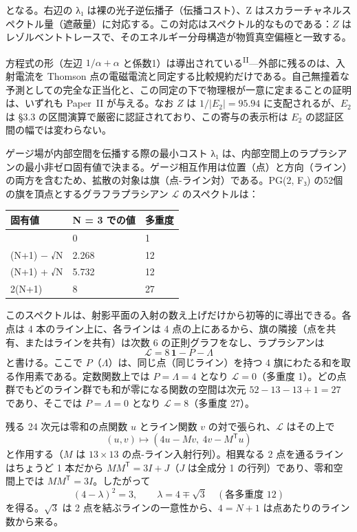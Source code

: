 \documentclass[fontsize=11pt,paper=a4,lualatex]{jlreq}
\newcommand{\PII}{\textsuperscript{\textup{II}}}
\begin{document}
となる。右辺の λ₁ は裸の光子逆伝播子（伝播コスト）、Z はスカラーチャネルスペクトル量（遮蔽量）に対応する。この対応はスペクトル的なものである：$Z$ はレゾルベントトレースで、そのエネルギー分母構造が物質真空偏極と一致する。

方程式の形（左辺 $1/\alpha + \alpha$ と係数1）は導出されている\PII{}---外部に残るのは、入射電流を Thomson 点の電磁電流と同定する比較規約だけである。自己無撞着な予測としての完全な正当化と、この同定の下で物理根が一意に定まることの証明は、いずれも Paper~II が与える。なお $Z$ は $1/|E_2| = 95.94$ に支配されるが、$E_2$ は §3.3 の区間演算で厳密に認証されており、この寄与の表示桁は $E_2$ の認証区間の幅では変わらない。

ゲージ場が内部空間を伝播する際の最小コスト λ₁
は、内部空間上のラプラシアンの最小非ゼロ固有値で決まる。ゲージ相互作用は位置（点）と方向（ライン）の両方を含むため、拡散の対象は旗（点-ライン対）である。PG(2,
F₃) の52個の旗を頂点とするグラフラプラシアン $\mathcal{L}$ のスペクトルは：

\begin{longtable}[]{@{}lll@{}}
\toprule\noalign{}
固有値 & N = 3 での値 & 多重度 \\
\midrule\noalign{}
\endhead
\bottomrule\noalign{}
\endlastfoot
0 & 0 & 1 \\
(N+1) − √N & 2.268 & 12 \\
(N+1) + √N & 5.732 & 12 \\
2(N+1) & 8 & 27 \\
\end{longtable}

このスペクトルは、射影平面の入射の数え上げだけから初等的に導出できる。各点は 4 本のライン上に、各ラインは 4 点の上にあるから、旗の隣接（点を共有、またはラインを共有）は次数 6 の正則グラフをなし、ラプラシアンは
\[\mathcal{L} = 8\,\mathbf{1} - P - \Lambda\]
と書ける。ここで $P$（$\Lambda$）は、同じ点（同じライン）を持つ 4 旗にわたる和を取る作用素である。定数関数上では $P = \Lambda = 4$ となり $\mathcal{L} = 0$（多重度 1）。どの点群でもどのライン群でも和が零になる関数の空間は次元 $52 - 13 - 13 + 1 = 27$ であり、そこでは $P = \Lambda = 0$ となり $\mathcal{L} = 8$（多重度 27）。

残る 24 次元は零和の点関数 $u$ とライン関数 $v$ の対で張られ、$\mathcal{L}$ はその上で
\[(u, v) \mapsto (4u - Mv,\ 4v - M^{\mathsf T}u)\]
と作用する（$M$ は $13 \times 13$ の点-ライン入射行列）。相異なる 2 点を通るラインはちょうど 1 本だから $M M^{\mathsf T} = 3I + J$（$J$ は全成分 1 の行列）であり、零和空間上では $M M^{\mathsf T} = 3I$。したがって
\[(4-\lambda)^2 = 3,\qquad \lambda = 4 \mp \sqrt{3}\quad(\text{各多重度 } 12)\]
を得る。$\sqrt3$ は 2 点を結ぶラインの一意性から、$4 = N + 1$ は点あたりのライン数から来る。
\end{document}
